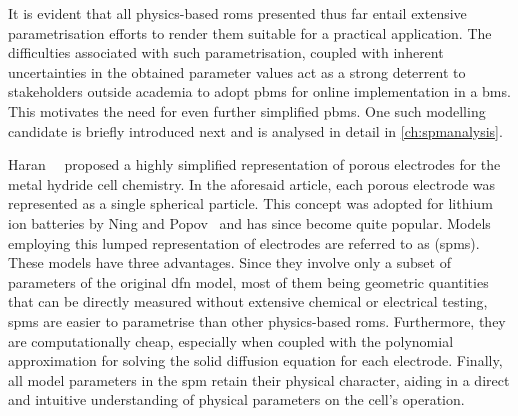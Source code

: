 


It  is evident  that all  physics-based  \glspl{rom} presented  thus far  entail
extensive  parametrisation  efforts to  render  them  suitable for  a  practical
application. The difficulties associated with such parametrisation, coupled with
inherent  uncertainties  in  the  obtained  parameter values  act  as  a  strong
deterrent  to stakeholders  outside  academia to  adopt  \glspl{pbm} for  online
implementation  in  a  \gls{bms}.  This  motivates the  need  for  even  further
simplified \glspl{pbm}. One such modelling  candidate is briefly introduced next
and is analysed in detail in \cref{ch:spmanalysis}.


Haran~\etal{}~\cite{Haran1998}  proposed a  highly simplified  representation of
porous  electrodes  for the  metal  hydride  cell  chemistry. In  the  aforesaid
article,  each   porous  electrode  was   represented  as  a   single  spherical
particle.  This concept  was  adopted  for lithium  ion  batteries  by Ning  and
Popov~\cite{Ning2004} and has since become  quite popular. Models employing this
lumped  representation  of  electrodes  are referred  to  as  
(\glspl{spm}).  These models  have  three advantages.  Since  they involve  only
a  subset  of  parameters  of  the   original  \gls{dfn}  model,  most  of  them
being  geometric quantities  that  can be  directly  measured without  extensive
chemical  or electrical  testing,  \glspl{spm} are  easier  to parametrise  than
other physics-based  \glspl{rom}. Furthermore,  they are  computationally cheap,
especially when coupled with the  polynomial approximation for solving the solid
diffusion  equation for  each electrode.  Finally, all  model parameters  in the
\gls{spm}  retain their  physical character,  aiding in  a direct  and intuitive
understanding of physical parameters on the cell's operation.

